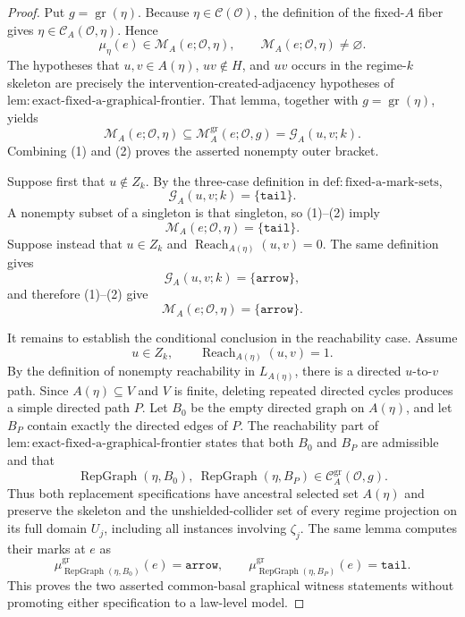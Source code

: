 \documentclass{article}
\begin{document}
\begin{proof}
Put \(g=\operatorname{gr}(\eta)\).  Because \(\eta\in\mathcal C(\mathcal O)\), the definition of the fixed-\(A\) fiber gives \(\eta\in\mathcal C_A(\mathcal O,\eta)\).  Hence
\[
 \mu_\eta(e)\in\mathcal M_A(e;\mathcal O,\eta),
 \qquad
 \mathcal M_A(e;\mathcal O,\eta)\ne\varnothing.
 \tag{1}
\]
The hypotheses that \(u,v\in A(\eta)\), \(uv\notin H\), and \(uv\) occurs in the regime-\(k\) skeleton are precisely the intervention-created-adjacency hypotheses of \(\mathrm{lem:exact\mbox{-}fixed\mbox{-}a\mbox{-}graphical\mbox{-}frontier}\).  That lemma, together with \(g=\operatorname{gr}(\eta)\), yields
\[
 \mathcal M_A(e;\mathcal O,\eta)
 \subseteq
 \mathcal M_A^{\mathrm{gr}}(e;\mathcal O,g)
 =\mathcal G_A(u,v;k).
 \tag{2}
\]
Combining (1) and (2) proves the asserted nonempty outer bracket.

Suppose first that \(u\notin Z_k\).  By the three-case definition in \(\mathrm{def:fixed\mbox{-}a\mbox{-}mark\mbox{-}sets}\),
\[
 \mathcal G_A(u,v;k)=\{\mathtt{tail}\}.
\]
A nonempty subset of a singleton is that singleton, so (1)--(2) imply
\[
 \mathcal M_A(e;\mathcal O,\eta)=\{\mathtt{tail}\}.
 \tag{3}
\]
Suppose instead that \(u\in Z_k\) and \(\operatorname{Reach}_{A(\eta)}(u,v)=0\).  The same definition gives
\[
 \mathcal G_A(u,v;k)=\{\mathtt{arrow}\},
\]
and therefore (1)--(2) give
\[
 \mathcal M_A(e;\mathcal O,\eta)=\{\mathtt{arrow}\}.
 \tag{4}
\]

It remains to establish the conditional conclusion in the reachability case.  Assume
\[
 u\in Z_k,
 \qquad
 \operatorname{Reach}_{A(\eta)}(u,v)=1.
 \tag{5}
\]
By the definition of nonempty reachability in \(L_{A(\eta)}\), there is a directed \(u\)-to-\(v\) path.  Since \(A(\eta)\subseteq V\) and \(V\) is finite, deleting repeated directed cycles produces a simple directed path \(P\).  Let \(B_0\) be the empty directed graph on \(A(\eta)\), and let \(B_P\) contain exactly the directed edges of \(P\).  The reachability part of \(\mathrm{lem:exact\mbox{-}fixed\mbox{-}a\mbox{-}graphical\mbox{-}frontier}\) states that both \(B_0\) and \(B_P\) are admissible and that
\[
 \operatorname{RepGraph}(\eta,B_0),\ 
 \operatorname{RepGraph}(\eta,B_P)
 \in\mathcal C_A^{\mathrm{gr}}(\mathcal O,g).
 \tag{6}
\]
Thus both replacement specifications have ancestral selected set \(A(\eta)\) and preserve the skeleton and the unshielded-collider set of every regime projection on its full domain \(U_j\), including all instances involving \(\zeta_j\).  The same lemma computes their marks at \(e\) as
\[
 \mu^{\mathrm{gr}}_{\operatorname{RepGraph}(\eta,B_0)}(e)
   =\mathtt{arrow},
 \qquad
 \mu^{\mathrm{gr}}_{\operatorname{RepGraph}(\eta,B_P)}(e)
   =\mathtt{tail}.
 \tag{7}
\]
This proves the two asserted common-basal graphical witness statements without promoting either specification to a law-level model.


\end{proof}
\end{document}
